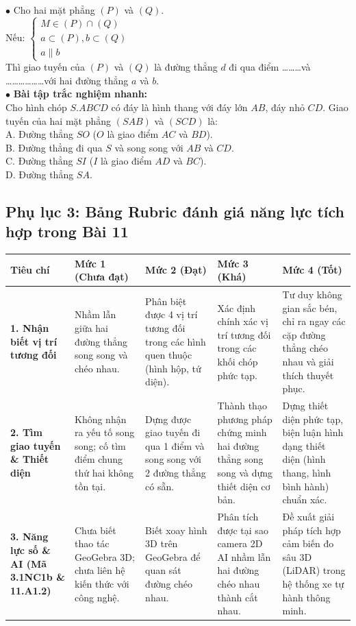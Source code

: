 \documentclass[12pt, a4paper]{article}
\begin{document}
\begin{pedabox}
$\bullet$ Cho hai mặt phẳng $(P)$ và $(Q)$.\\
Nếu:
$\begin{cases}
M \in (P) \cap (Q) \\
a \subset (P), b \subset (Q) \\
a \parallel b
\end{cases}$\\
Thì giao tuyến của $(P)$ và $(Q)$ là đường thẳng $d$ đi qua điểm \dots\dots\dots và \dots\dots\dots\dots\dots\dots với hai đường thẳng $a$ và $b$.\\[0.3em]
$\bullet$ \textbf{Bài tập trắc nghiệm nhanh:}\\
Cho hình chóp $S.ABCD$ có đáy là hình thang với đáy lớn $AB$, đáy nhỏ $CD$. Giao tuyến của hai mặt phẳng $(SAB)$ và $(SCD)$ là:\\
A. Đường thẳng $SO$ ($O$ là giao điểm $AC$ và $BD$).\\
B. Đường thẳng đi qua $S$ và song song với $AB$ và $CD$.\\
C. Đường thẳng $SI$ ($I$ là giao điểm $AD$ và $BC$).\\
D. Đường thẳng $SA$.
\end{pedabox}

\subsection*{Phụ lục 3: Bảng Rubric đánh giá năng lực tích hợp trong Bài 11}

\begin{center}
\begin{tabularx}{\linewidth}{|p{3.2cm}|X|X|X|X|}
\hline
\textbf{Tiêu chí} & \textbf{Mức 1 (Chưa đạt)} & \textbf{Mức 2 (Đạt)} & \textbf{Mức 3 (Khá)} & \textbf{Mức 4 (Tốt)} \\
\hline
\textbf{1. Nhận biết vị trí tương đối} & Nhầm lẫn giữa hai đường thẳng song song và chéo nhau. & Phân biệt được 4 vị trí tương đối trong các hình quen thuộc (hình hộp, tứ diện). & Xác định chính xác vị trí tương đối trong các khối chóp phức tạp. & Tư duy không gian sắc bén, chỉ ra ngay các cặp đường thẳng chéo nhau và giải thích thuyết phục. \\
\hline
\textbf{2. Tìm giao tuyến \& Thiết diện} & Không nhận ra yếu tố song song; cố tìm điểm chung thứ hai không tồn tại. & Dựng được giao tuyến đi qua 1 điểm và song song với 2 đường thẳng có sẵn. & Thành thạo phương pháp chứng minh hai đường thẳng song song và dựng thiết diện cơ bản. & Dựng thiết diện phức tạp, biện luận hình dạng thiết diện (hình thang, hình bình hành) chuẩn xác. \\
\hline
\textbf{3. Năng lực số \& AI (Mã 3.1NC1b \& 11.A1.2)} & Chưa biết thao tác GeoGebra 3D; chưa liên hệ kiến thức với công nghệ. & Biết xoay hình 3D trên GeoGebra để quan sát đường chéo nhau. & Phân tích được tại sao camera 2D AI nhầm lẫn hai đường chéo nhau thành cắt nhau. & Đề xuất giải pháp tích hợp cảm biến đo sâu 3D (LiDAR) trong hệ thống xe tự hành thông minh. \\
\hline
\end{tabularx}
\end{center}
\end{document}
